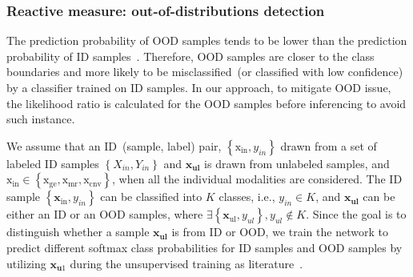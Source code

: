 \subsubsection{Reactive measure: out-of-distributions detection}
\noindent The prediction probability of OOD samples tends to be lower than the prediction probability of ID samples~\cite{OOD18}. Therefore, OOD samples are closer to the class boundaries and more likely to be misclassified~(or classified with low confidence) by a classifier trained on ID samples. In our approach, to mitigate OOD issue, the likelihood ratio is calculated for the OOD samples before inferencing to avoid such instance.  

We assume that an ID~(sample, label) pair, $\left\{\mathrm{x}_{\text {in}}, y_{in}\right\}$ drawn from a set of labeled ID samples $\left\{X_{in}, Y_{in}\right\}$ and $\mathbf{x}_{\mathbf{ul}}$ is drawn from unlabeled samples, and $\mathrm{x}_\text{in} \in \left\{\mathrm{x}_{\text {ge}}, \mathrm{x}_{\text {mr}}, \mathrm{x}_{\text {cnv}}\right\}$, when all the individual modalities are considered. The ID sample $\left\{\mathbf{x}_{\text {in}}, y_{in}\right\}$ can be classified into $K$ classes, i.e., $y_{in} \in K$, and $\mathbf{x}_{\mathbf{ul}}$ can be either an ID or an OOD samples, where $\exists\left\{\mathbf{x}_{\text {ul}}, y_{ul}\right\}, y_{ul} \notin K$. Since the goal is to distinguish whether a sample $\mathbf{x}_{\mathbf{ul}}$ is from ID or OOD, we train the network to predict different softmax class probabilities for ID samples and OOD samples by utilizing $\mathbf{x}_{\mathbf{u}1}$ during the unsupervised training as literature~\cite{OOD19}. 

